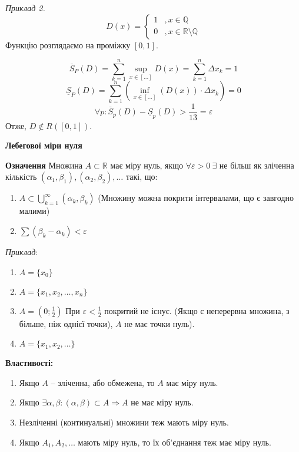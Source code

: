 \documentclass[12pt]{report}
\begin{document}
\textit{Приклад 2.}
$$D(x) =  \begin{cases} 1 &, x \in \mathbb{Q} \\
						  0 &, x \in \mathbb{R} \setminus \mathbb{Q} \end{cases}$$
Функцію розглядаємо на проміжку $[0,1]$.

$$\overline S_{P} (D) = \sum_{k=1}^n \sup_{x \in [\ldots]} D(x) = \sum_{k=1}^n \Delta x_k = 1$$
$$\underline S_{P} (D) = \sum_{k=1}^n( \inf_{x \in [\ldots]} (D(x)) \cdot  \Delta x_k) = 0$$
$$\forall p : \overline S_{p}(D) - \underline S_{p} (D) > \frac{1}{13} =  \varepsilon$$
Отже, $D \notin R([0,1])$.

\begin{center}
	\textbf{ Лебегової міри нуля} 
\end{center}

\textbf{Означення} Множина $A \subset \mathbb{R}$ має міру нуль, якщо $\forall \varepsilon > 0 \ \exists$ не більш як зліченна кількість $ (\alpha_1,\beta_1), (\alpha_2,\beta_2), \ldots$ такі, що:

\begin{enumerate}

\item $A \subset \bigcup_{k=1}^{\infty} (\alpha_k, \beta_k)$ (Множину можна покрити інтервалами, що є завгодно малими)

\item $\sum (\beta_k - \alpha_k) < \varepsilon$

\end{enumerate}

\textit{Приклад}:

\begin{enumerate}

\item $A = \{ x_0\}$
\item $A = \{ x_1, x_2, \ldots, x_n\}$
\item $A = (0; \frac{1}{2})$ При $\varepsilon < \frac{1}{2}$ покритий не існує. (Якщо є неперервна множина, з більше, ніж однієї точки), $A$ не має точки нуль).
\item $A = \{ x_1, x_2, \ldots\}$
\end{enumerate}

\textbf{Властивості:}

\begin{enumerate}

\item Якщо $A$ -- зліченна, або обмежена, то $A$ має міру нуль.
\item Якщо $\exists \alpha, \beta : (\alpha, \beta) \subset A \Longrightarrow A$ не має міру нуль.
\item Незліченні (континуальні) множини теж мають міру нуль.
\item Якщо $A_1, A_2, \ldots$ мають міру нуль, то їх об'єднання теж має міру нуль.  

\end{enumerate}
\end{document}

